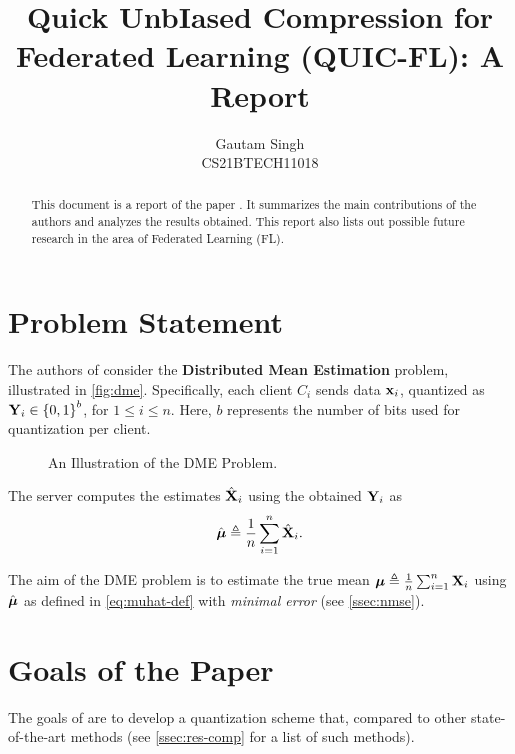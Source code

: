 \documentclass[journal,12pt,twocolumn]{IEEEtran}
\begin{document}
\vspace{3cm}
\title{Quick UnbIased Compression for Federated Learning (QUIC-FL): A Report}
\author{Gautam Singh\\CS21BTECH11018}
\maketitle
\tableofcontents
\bigskip

\begin{abstract}
    This document is a report of the paper \cite{basat2023quicfl}. It 
    summarizes the main contributions of the authors and analyzes the results
    obtained. This report also lists out possible future research in the area
    of Federated Learning (FL).
\end{abstract}

\section{Problem Statement}
\label{sec:ps}
The authors of \cite{basat2023quicfl} consider the \textbf{Distributed Mean 
Estimation} problem, illustrated in \autoref{fig:dme}. Specifically, each 
client \(C_i\) sends data \(\boldsymbol{\mathbf{x}}_i\), quantized as \(\boldsymbol{\mathbf{Y}}_i\in
\left\{0,1\right\}^b\), for \(1 \le i \le n\). Here, \(b\) represents the number
of bits used for quantization per client.

\begin{figure}[!ht]
    
    \caption{An Illustration of the DME Problem.}
    \label{fig:dme}
\end{figure}

The server computes the estimates \(\hat{\boldsymbol{\mathbf{X}}}_i\) using the obtained 
\(\boldsymbol{\mathbf{Y}}_i\) as
\begin{equation}
    \hat{\boldsymbol{\mathbf{\mu}}} \triangleq \frac{1}{n}\sum_{i=1}^n\hat{\boldsymbol{\mathbf{X}}}_i.
    \label{eq:muhat-def}
\end{equation}

The aim of the DME problem is to estimate the true mean \(\boldsymbol{\mathbf{\mu}} \triangleq
\frac{1}{n}\sum_{i=1}^n\boldsymbol{\mathbf{X}}_i\) using \(\hat{\boldsymbol{\mathbf{\mu}}}\) as defined in
\eqref{eq:muhat-def} with \emph{minimal error} (see \autoref{ssec:nmse}).

\section{Goals of the Paper}
\label{sec:goals}
The goals of \cite{basat2023quicfl} are to develop a quantization scheme that,
compared to other state-of-the-art methods (see \autoref{ssec:res-comp} for a 
list of such methods).
\end{document}
